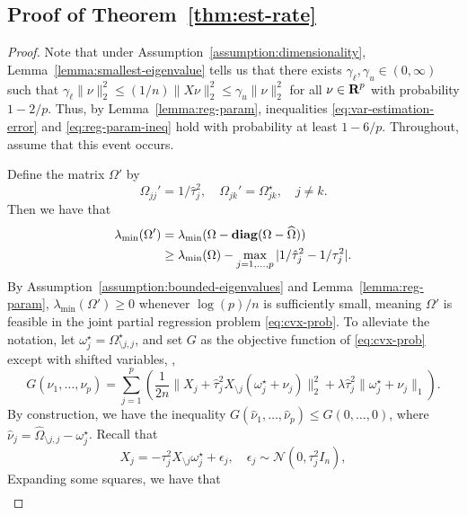 \documentclass{article}
\begin{document}
\subsection{Proof of Theorem~\ref{thm:est-rate}}
\begin{proof}
Note that under Assumption~\ref{assumption:dimensionality},
Lemma~\ref{lemma:smallest-eigenvalue} tells us that there exists $\gamma_\ell,
\gamma_u \in (0,\infty)$ such that $\gamma_\ell \|\nu\|_2^2 \leq (1/n)\|X
\nu\|_2^2 \leq \gamma_u \|\nu\|_2^2$ for all $\nu\in{\mbox{\bf R}}^p$ with probability
$1 - 2/p$. Thus, by Lemma~\ref{lemma:reg-param}, inequalities
\eqref{eq:var-estimation-error} and \eqref{eq:reg-param-ineq} hold with
probability at least $1 - 6/p$. Throughout, assume that this event occurs.

Define the matrix $\Omega'$ by 
\begin{equation}
        \Omega_{jj}' = 1 / \hat \tau_j^2, \quad \Omega_{jk}' = \Omega_{jk}^\star, \quad j \neq k.
\end{equation}
Then we have that 
\begin{equation}
    \begin{aligned}
        \lambda_\text{min}(\Omega') &= \lambda_\text{min}(\Omega - \mathop{\bf diag}(\Omega - \widehat{\Omega})) \\
                                &\geq \lambda_\text{min}(\Omega) - \max_{j=1, \dots, p}|1 / \hat \tau_j^2 - 1 / \tau_j^2|.
    \end{aligned}
\end{equation}
By Assumption~\ref{assumption:bounded-eigenvalues} and
Lemma~\ref{lemma:reg-param}, $\lambda_\text{min}(\Omega') \geq 0$ whenever
$\log(p)/n$ is sufficiently small, meaning $\Omega'$ is feasible in the joint
partial regression problem \eqref{eq:cvx-prob}. To alleviate the notation, let
$\omega^\star_j = \Omega_{\setminus j, j}^\star$, and set $G$ as the objective
function of \eqref{eq:cvx-prob} except with shifted variables, \ie, 
\[
    G(\nu_1, \dots, \nu_p) = \sum_{j=1}^p \left(\frac{1}{2n} \|X_j + \hat\tau_j^2 X_{\setminus j}(\omega^\star_j + \nu_j) \|_2^2 + \lambda \hat\tau^2_j \|\omega^\star_j + \nu_j\|_1\right).
\]
By construction, we have the inequality $G(\hat \nu_1, \dots, \hat \nu_p) \leq
G(0, \dots, 0)$, where $\hat \nu_j = \widehat{\Omega} _{\setminus j, j} -
\omega^\star_j$. Recall that 
\[
    X_j = -\tau_j^2 X_{\setminus j} \omega^\star_j + \epsilon_j, \quad \epsilon_j \sim \mathcal{N}(0, \tau_j^2 I_n),
\]
Expanding some squares, we have that
\begin{equation}
    \begin{aligned}

\end{aligned}
\end{equation}
\end{proof}
\end{document}
